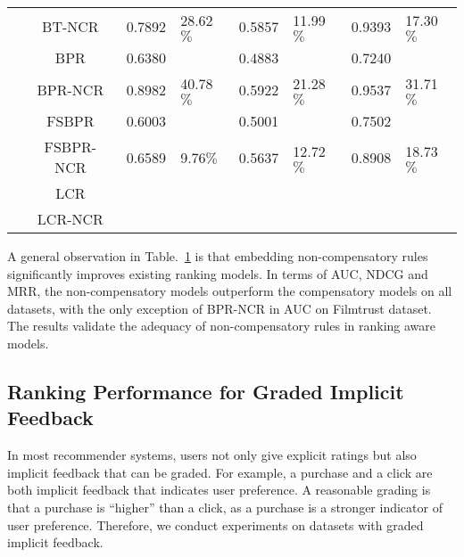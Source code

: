 \documentclass[letterpaper]{article} %
\begin{document}
\begin{table}[htp]
\begin{center}
\begin{tabular}{|p{0.5cm}|c|c|p{0.8cm}|c|p{0.5cm}|c|p{0.5cm}|}
	& BT-NCR	& 0.7892&  	28.62$\%$& 	0.5857 	& 11.99$\%$& 	0.9393 	& 17.30$\%$\\\cline{2-8}
	& BPR	& 0.6380 		& & 0.4883 		& & 0.7240 & 	\\\cline{2-8}
	& BPR-NCR	& 0.8982 	& 40.78$\%$& 	0.5922 	& 21.28$\%$& 	0.9537 	& 31.71$\%$\\\cline{2-8}
	& FSBPR	& 0.6003 		& & 0.5001 & & 		0.7502 	& \\\cline{2-8}
	& FSBPR-NCR	& 0.6589 	& 9.76$\%	$& 0.5637 	& 12.72$\%$& 	0.8908 	& 18.73$\%$\\\cline{2-8}
	& LCR			 & & & & & & 		\\\cline{2-8}	
	& LCR-NCR	& & & & & & 			\\\hline		
\end{tabular}
\end{center}
\label{tab:rankingresult}
\end{table}%

A general observation in Table.~\ref{tab:rankingresult} is that embedding non-compensatory rules significantly improves existing ranking models. In terms of AUC, NDCG and MRR, the non-compensatory models outperform the compensatory models on all datasets, with the only exception of BPR-NCR in AUC on Filmtrust dataset. The results validate the adequacy of non-compensatory rules in ranking aware models. 

\subsection{Ranking Performance for Graded Implicit Feedback}
In most recommender systems, users not only give explicit ratings but also implicit feedback that can be graded. For example, a purchase and a click are both implicit feedback that indicates user preference. A reasonable grading is that a purchase is ``higher'' than a click, as a purchase is a stronger indicator of user preference. Therefore, we conduct experiments on datasets with graded implicit feedback.  
\end{document}
